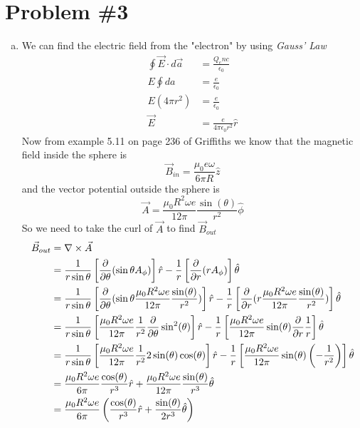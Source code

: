 \documentclass[11pt]{article}
\numberwithin{equation}{section}
\newcommand{\grad}{\bold\nabla}
\newcommand{\da}{d\vec{a}}
\begin{document}
\section{Problem \#3}
\begin{enumerate}[(a)]
\item
We can find the electric field from the "electron" by using \emph{Gauss' Law}
\begin{align*}
\oint\vec{E}\cdot\da &= \frac{Q_enc}{\epsilon_0}\\
E\oint da &= \frac{e}{\epsilon_0}\\
E(4\pi r^2) &= \frac{e}{\epsilon_0}\\
\vec{E} &= \frac{e}{4\pi\epsilon_0 r^2}\hat{r}
\end{align*}
Now from example 5.11 on page 236 of Griffiths we know that the magnetic field inside the sphere is
$$\vec{B}_{in} = \frac{\mu_0e\omega}{6\pi R}\hat{z}$$
and the vector potential outside the sphere is
$$\vec{A} = \frac{\mu_0R^2\omega e}{12\pi}\frac{\sin(\theta)}{r^2}\hat{\phi}$$
So we need to take the curl of $\vec{A}$ to find $\vec{B}_{out}$
\begin{align*}
\vec{B}_{out} &= \grad\times\vec{A}\\
&= \frac{1}{r\sin\theta}\left[\frac{\partial}{\partial\theta}(\sin\theta A_{\phi})\right]\hat{r} - \frac{1}{r}\left[\frac{\partial}{\partial r}(rA_{\phi})\right]\hat{\theta}\\
&= \frac{1}{r\sin\theta}\left[\frac{\partial}{\partial\theta}(\sin\theta\frac{\mu_0R^2\omega e}{12\pi}\frac{\sin(\theta)}{r^2} )\right]\hat{r} - \frac{1}{r}\left[\frac{\partial}{\partial r}(r\frac{\mu_0R^2\omega e}{12\pi}\frac{\sin(\theta)}{r^2})\right]\hat{\theta}\\
&= \frac{1}{r\sin\theta}\left[\frac{\mu_0R^2\omega e}{12\pi}\frac{1}{r^2}\frac{\partial}{\partial\theta}\sin^2(\theta)\right]\hat{r} - \frac{1}{r}\left[\frac{\mu_0R^2\omega e}{12\pi}\sin(\theta)\frac{\partial}{\partial r}\frac{1}{r}\right]\hat{\theta}\\
&= \frac{1}{r\sin\theta}\left[\frac{\mu_0R^2\omega e}{12\pi}\frac{1}{r^2}2\sin(\theta)\cos(\theta)\right]\hat{r} - \frac{1}{r}\left[\frac{\mu_0R^2\omega e}{12\pi}\sin(\theta)\left(-\frac{1}{r^2}\right)\right]\hat{\theta}\\
&= \frac{\mu_0R^2\omega e}{6\pi}\frac{\cos(\theta)}{r^3}\hat{r} + \frac{\mu_0R^2\omega e}{12\pi}\frac{\sin(\theta)}{r^3}\hat{\theta}\\
&= \frac{\mu_0R^2\omega e}{6\pi}\left(\frac{\cos(\theta)}{r^3}\hat{r} + \frac{\sin(\theta)}{2r^3}\hat{\theta}\right)

\end{align*}
\end{enumerate}
\end{document}
